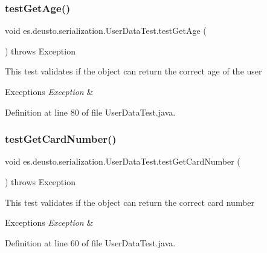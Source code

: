 \subsubsection{\texorpdfstring{test\+Get\+Age()}{testGetAge()}}
{\footnotesize\ttfamily void es.\+deusto.\+serialization.\+User\+Data\+Test.\+test\+Get\+Age (\begin{DoxyParamCaption}{ }\end{DoxyParamCaption}) throws Exception}

This test validates if the object can return the correct age of the user 
\begin{DoxyExceptions}{Exceptions}
{\em Exception} & \\
\hline
\end{DoxyExceptions}


Definition at line 80 of file User\+Data\+Test.\+java.

\mbox{\label{classes_1_1deusto_1_1serialization_1_1_user_data_test_ae66eef68b1682794e0433b331e6ccff5}} 
\subsubsection{\texorpdfstring{test\+Get\+Card\+Number()}{testGetCardNumber()}}
{\footnotesize\ttfamily void es.\+deusto.\+serialization.\+User\+Data\+Test.\+test\+Get\+Card\+Number (\begin{DoxyParamCaption}{ }\end{DoxyParamCaption}) throws Exception}

This test validates if the object can return the correct card number 
\begin{DoxyExceptions}{Exceptions}
{\em Exception} & \\
\hline
\end{DoxyExceptions}


Definition at line 60 of file User\+Data\+Test.\+java.

\mbox{\label{classes_1_1deusto_1_1serialization_1_1_user_data_test_ab89ad0d38dbae7e956619e6543586122}} 
